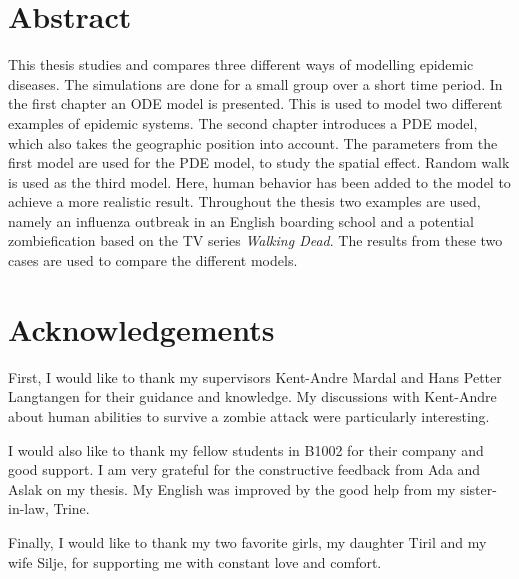 \documentclass[%
twoside,                 %
final,                   %
chapterprefix=true,      %
open=right               %
10pt]{book}
\begin{document}





\newcommand{\Imax}{I_{\textrm{max}}}

\chapter*{Abstract}
This thesis studies and compares three different ways of modelling epidemic diseases. The simulations are done for a small group over a short time period. In the first chapter an ODE model is presented. This is used to model two different examples of epidemic systems. The second chapter introduces a PDE model, which also takes the geographic position into account. The parameters from the first model are used for the PDE model, to study the spatial effect. Random walk is used as the third model. Here, human behavior has been added to the model to achieve a more realistic result. Throughout the thesis two examples are used, namely an influenza outbreak in an English boarding school and a potential zombiefication based on the TV series \emph{Walking Dead}. The results from these two cases are used to compare the different models. 

\chapter*{Acknowledgements}
First, I would like to thank my supervisors Kent-Andre Mardal and Hans Petter Langtangen for their guidance and knowledge. My discussions with Kent-Andre about human abilities to survive a zombie attack were particularly interesting. 


\vspace{3mm}


I would also like to thank my fellow students in B1002 for their company and good support. I am very grateful for the constructive feedback from Ada and Aslak on my thesis. My English was improved by the good help from my sister-in-law, Trine.


\vspace{3mm}


Finally, I would like to thank my two favorite girls, my daughter Tiril and my wife Silje, for supporting me with constant love and comfort.     



\tableofcontents


\vspace{1cm} %
\end{document}
